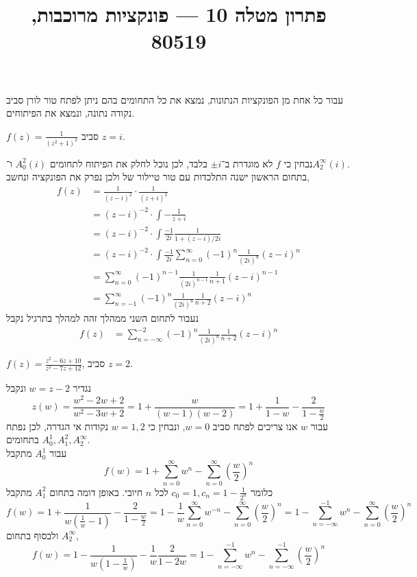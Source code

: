 
\title{פתרון מטלה 10 --- פונקציות מרוכבות, 80519}


\maketitle
\maketitleprint{}

\question{}
עבור כל אחת מן הפונקציות הנתונות, נמצא את כל התחומים בהם ניתן לפתח טור לורן סביב נקודה נתונה, ונמצא את הפיתוחים.

\subquestion{}
$f(z) = \frac{1}{{(z^2 + 1)}^2}$ סביב $z = i$.
\begin{solution}
	נבחין כי $f$ לא מוגדרת ב־$\pm i$ בלבד, לכן נוכל לחלק את הפיתוח לתחומים $A_0^2(i)$ ו־$A_2^\infty(i)$. \\
	בתחום הראשון ישנה התלכדות עם טור טיילור של ולכן נפרק את הפונקציה ונחשב,
	\begin{align*}
		f(z)
		& = \frac{1}{{(z - i)}^2} \cdot \frac{1}{{(z + i)}^2} \\
		& = {(z - i)}^{-2} \cdot \int -\frac{1}{z + i} \\
		& = {(z - i)}^{-2} \cdot \int \frac{-1}{2i} \frac{1}{1 + (z - i)/2i} \\
		& = {(z - i)}^{-2} \cdot \int \frac{-1}{2i} \sum_{n = 0}^{\infty} {(-1)}^n \frac{1}{{(2i)}^n} {(z - i)}^n \\
		& = \sum_{n = 0}^{\infty} {(-1)}^{n - 1} \frac{1}{{(2i)}^{n - 1}} \frac{1}{n + 1} {(z - i)}^{n - 1} \\
		& = \sum_{n = -1}^{\infty} {(-1)}^n \frac{1}{{(2i)}^n} \frac{1}{n + 2} {(z - i)}^n
	\end{align*}
	נעבור לתחום השני ממהלך זהה למהלך בתרגיל נקבל
	\begin{align*}
		f(z)
		& = \sum_{n = -\infty}^{-2} {(-1)}^n \frac{1}{{(2i)}^n} \frac{1}{n + 2} {(z - i)}^n
	\end{align*}
\end{solution}

\subquestion{}
$f(z) = \frac{z^2 - 6z + 10}{z^2 - 7z + 12}$, סביב $z = 2$.
\begin{solution}
	נגדיר $w = z - 2$ ונקבל
	\[
		z(w) = \frac{w^2 - 2w + 2}{w^2 - 3w + 2}
		= 1 + \frac{w}{(w - 1)(w - 2)} 
		= 1 + \frac{1}{1 - w} - \frac{2}{1 - \frac{w}{2}}
	\]
	עבור $w$ אנו צריכים לפתח סביב $w = 0$, ונבחין כי $w = 1, 2$ נקודות אי הגדרה, לכן נפתח בתחומים $A_0^1, A_1^2, A_2^\infty$. \\
	עבור $A_0^1$ מתקבל
	\[
		f(w)
		= 1 + \sum_{n = 0}^{\infty} w^n - \sum_{n = 0}^{\infty} {(\frac{w}{2})}^n
	\]
	כלומר $c_0 = 1, c_n = 1 - \frac{1}{2^n}$ לכל $n$ חיובי.
	באופן דומה בתחום $A_1^2$ מתקבל
	\[
		f(w)
		= 1 + \frac{1}{w(\frac{1}{w} - 1)} - \frac{2}{1 - \frac{w}{2}}
		= 1 - \frac{1}{w} \sum_{n = 0}^{\infty} w^{-n} - \sum_{n = 0}^{\infty} {(\frac{w}{2})}^n
		= 1 - \sum_{n = -\infty}^{-1} w^{n} - \sum_{n = 0}^{\infty} {(\frac{w}{2})}^n
	\]
	ולבסוף בתחום $A_2^\infty$,
	\[
		f(w)
		= 1 - \frac{1}{w(1 - \frac{1}{w})} - \frac{1}{w} \frac{2}{1 - 2w}
		= 1 - \sum_{n = -\infty}^{-1} w^{n} - \sum_{n = -\infty}^{-1} {(\frac{w}{2})}^n
	\]
\end{solution}

